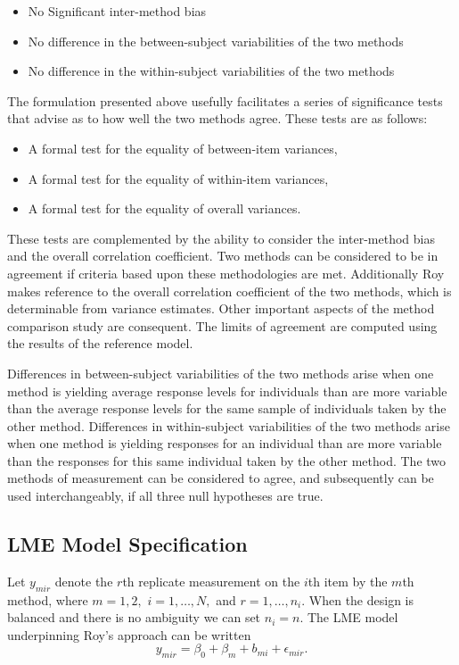 \documentclass[12pt, a4paper]{report}
\theoremstyle{plain}
\theoremstyle{definition}
\theoremstyle{remark}
\begin{document}
	\begin{itemize}\itemsep0.5cm
		\item No Significant inter-method bias
		\item No difference in the between-subject variabilities of the two methods
		\item No difference in the within-subject variabilities of the two methods
	\end{itemize}
	
	The formulation presented above usefully facilitates a series of
	significance tests that advise as to how well the two methods
	agree. These tests are as follows:
	\begin{itemize}
		\item A formal test for the equality of between-item variances,
		\item A formal test for the equality of within-item variances,
		\item A formal test for the equality of overall variances.
	\end{itemize}
	These tests are complemented by the ability to consider the inter-method bias and the overall correlation coefficient. Two methods can be considered to be in agreement if criteria based upon these methodologies are met. Additionally Roy makes reference to the overall correlation coefficient of the two methods, which is determinable from variance estimates. Other important aspects of the method comparison study are consequent. The limits of agreement are computed using the results of the reference model.
	
	Differences in between-subject variabilities of the two methods arise when one method is yielding average response levels for individuals than are more variable than the average response levels for the same sample of individuals taken by the other method.  Differences in within-subject variabilities of the two methods arise when one method is yielding responses for an individual than are more variable than the responses for this same individual taken by the other method. The two methods of measurement can be considered to agree, and subsequently can be used interchangeably, if all three null hypotheses are true.	
	
	
	\subsection{LME Model Specification}
	
	Let $y_{mir} $ denote the $r$th replicate measurement on the $i$th item by the $m$th method, where $m=1,2,$ $i=1,\ldots,N,$ and $r = 1,\ldots,n_i.$ When the design is balanced and there is no ambiguity we can set $n_i=n.$ The LME model underpinning Roy's approach can be written
	\begin{equation}\label{Roy-model}
	y_{mir} = \beta_{0} + \beta_{m} + b_{mi} + \epsilon_{mir}.
	\end{equation}
	
\end{document}
